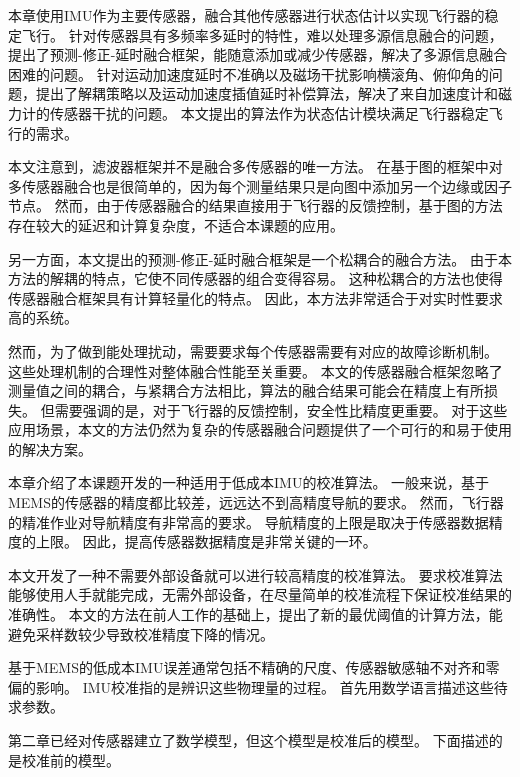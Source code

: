 \documentclass[
  type=master
]{gdutthesis}
\begin{document}
本章使用IMU作为主要传感器，融合其他传感器进行状态估计以实现飞行器的稳定飞行。
针对传感器具有多频率多延时的特性，难以处理多源信息融合的问题，提出了预测-修正-延时融合框架，能随意添加或减少传感器，解决了多源信息融合困难的问题。
针对运动加速度延时不准确以及磁场干扰影响横滚角、俯仰角的问题，提出了解耦策略以及运动加速度插值延时补偿算法，解决了来自加速度计和磁力计的传感器干扰的问题。
本文提出的算法作为状态估计模块满足飞行器稳定飞行的需求。

本文注意到，滤波器框架并不是融合多传感器的唯一方法。
在基于图的框架中对多传感器融合也是很简单的，因为每个测量结果只是向图中添加另一个边缘或因子节点\cite{schleicher2009real}。
然而，由于传感器融合的结果直接用于飞行器的反馈控制，基于图的方法存在较大的延迟和计算复杂度，不适合本课题的应用。

另一方面，本文提出的预测-修正-延时融合框架是一个松耦合的融合方法。
由于本方法的解耦的特点，它使不同传感器的组合变得容易。
这种松耦合的方法也使得传感器融合框架具有计算轻量化的特点。
因此，本方法非常适合于对实时性要求高的系统。

然而，为了做到能处理扰动，需要要求每个传感器需要有对应的故障诊断机制。
这些处理机制的合理性对整体融合性能至关重要。
本文的传感器融合框架忽略了测量值之间的耦合，与紧耦合方法相比，算法的融合结果可能会在精度上有所损失\cite{indelman2013incremental}。
但需要强调的是，对于飞行器的反馈控制，安全性比精度更重要。
对于这些应用场景，本文的方法仍然为复杂的传感器融合问题提供了一个可行的和易于使用的解决方案。

本章介绍了本课题开发的一种适用于低成本IMU的校准算法。
一般来说，基于MEMS的传感器的精度都比较差，远远达不到高精度导航的要求。
然而，飞行器的精准作业对导航精度有非常高的要求。
导航精度的上限是取决于传感器数据精度的上限。
因此，提高传感器数据精度是非常关键的一环。

本文开发了一种不需要外部设备就可以进行较高精度的校准算法。
要求校准算法能够使用人手就能完成，无需外部设备，在尽量简单的校准流程下保证校准结果的准确性。
本文的方法在前人工作的基础上，提出了新的最优阈值的计算方法，能避免采样数较少导致校准精度下降的情况。

基于MEMS的低成本IMU误差通常包括不精确的尺度、传感器敏感轴不对齐和零偏的影响。
IMU校准指的是辨识这些物理量的过程。
首先用数学语言描述这些待求参数。

第二章已经对传感器建立了数学模型，但这个模型是校准后的模型。
下面描述的是校准前的模型。
\end{document}

